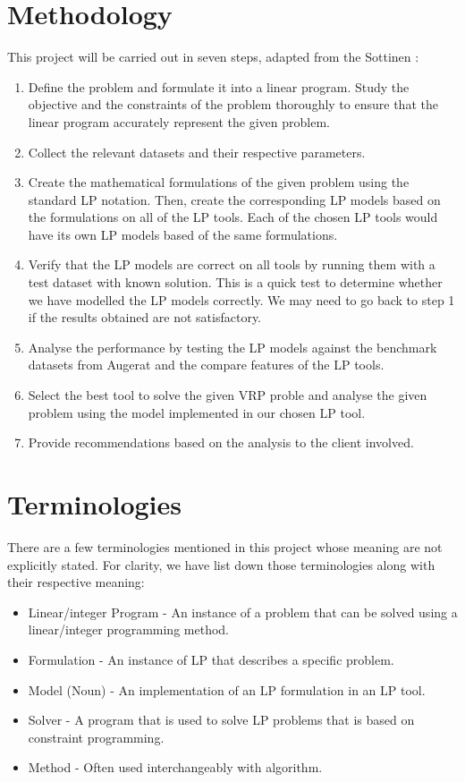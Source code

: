 \section{Methodology}
This project will be carried out in seven steps, adapted from the Sottinen \cite{Sottinen2009}:
\begin{enumerate}
\item Define the problem and formulate it into a linear program. Study the objective and the constraints of the problem thoroughly to ensure
that the linear program accurately represent the given problem.
\item Collect the relevant datasets and their respective parameters.
\item Create the mathematical formulations of the given problem using the standard LP notation.
Then, create the corresponding LP models based on the formulations on all of the LP tools. Each of the chosen LP tools would
have its own LP models based of the same formulations.
\item Verify that the LP models are correct on all tools by running them with a test dataset with known solution. This is a quick test
to determine whether we have modelled the LP models correctly. We may need to go back to step 1 if the results obtained
are not satisfactory.
\item Analyse the performance by testing the LP models
 against the benchmark datasets from Augerat \cite{Augerat1998} and the compare features of the LP tools.
\item Select the best tool to solve the given VRP proble and analyse the given problem using the model implemented in our chosen LP tool.
\item Provide recommendations based on the analysis to the client involved.
\end{enumerate}

\section{Terminologies}
There are a few terminologies mentioned in this project whose meaning are not explicitly stated.
For clarity, we have list down those terminologies along with their respective meaning:
\begin{itemize}
\item Linear/integer Program - An instance of a problem that can be solved using a linear/integer programming method.
\item Formulation - An instance of LP that describes a specific problem.
\item Model (Noun) - An implementation of an LP formulation in an LP tool.
\item Solver - A program that is used to solve LP problems that is based on constraint programming.
\item Method - Often used interchangeably with algorithm.
\end{itemize}


